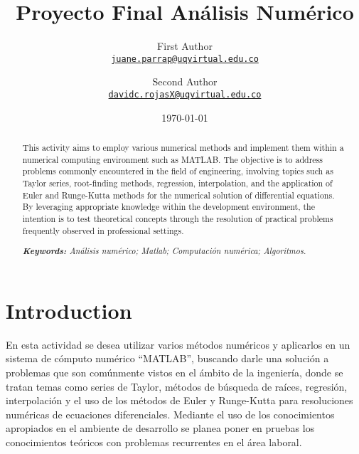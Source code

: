 \documentclass[11pt]{article}
\title{Proyecto Final Análisis Numérico}
\author{First Author\\%
    \href{mailto:juane.parrap@uqvirtual.edu.co}{\texttt{juane.parrap@uqvirtual.edu.co}} %
\and Second Author\\%
    \href{mailto:secondauthor@ufl.edu}{\texttt{davidc.rojasX@uqvirtual.edu.co}} %
   }
\date{\today}
\begin{document}
{
\maketitle
\begin{abstract}

	This activity aims to employ various numerical methods and implement them within a numerical computing environment such as MATLAB. The objective is to address problems commonly encountered in the field of engineering, involving topics such as Taylor series, root-finding methods, regression, interpolation, and the application of Euler and Runge-Kutta methods for the numerical solution of differential equations.
	By leveraging appropriate knowledge within the development environment, the intention is to test theoretical concepts through the resolution of practical problems frequently observed in professional settings.

	\noindent
	\textit{\textbf{Keywords: }%
		Análisis numérico; Matlab; Computación numérica; Algoritmos.} \\ %
	\noindent

\end{abstract}
}


\section{Introduction}

En esta actividad se desea utilizar varios métodos numéricos y aplicarlos en un sistema de cómputo numérico  “MATLAB”, buscando darle una solución a problemas que son comúnmente vistos en el ámbito de la ingeniería, donde se tratan temas como series de Taylor, métodos de búsqueda de raíces, regresión, interpolación y el uso de los métodos de Euler y Runge-Kutta para resoluciones numéricas de ecuaciones diferenciales.
Mediante el uso de los conocimientos apropiados en el ambiente de desarrollo se planea poner en pruebas los conocimientos teóricos con problemas recurrentes en el área laboral.
\end{document}
